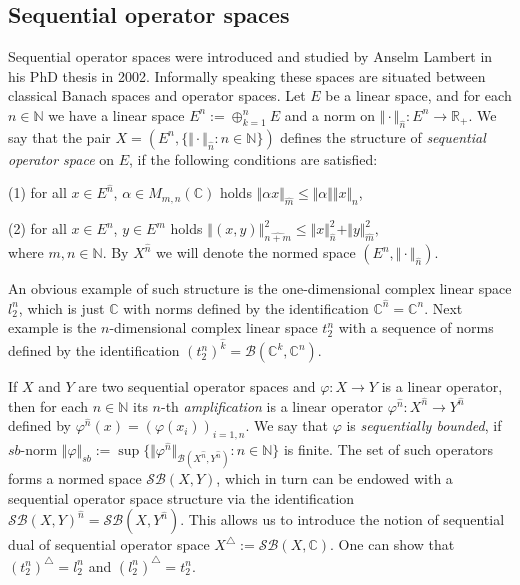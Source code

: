 \documentclass[a0b,landscape]{a0poster}
\begin{document}
\begin{multicols}{4}
\section*{Sequential operator spaces}

Sequential operator spaces were introduced and studied by Anselm Lambert in his
PhD thesis in 2002. Informally speaking these spaces are situated between
classical Banach spaces and operator spaces. Let $E$ be a linear space, and for
each $n\in\mathbb{N}$ we have a linear space $E^n:=\oplus_{k=1}^n E$ and a norm
on $\Vert \cdot \Vert_{\widehat{n}}:E^n\to\mathbb{R}_+$. We say that the pair $X
= (E^n, \{\Vert \cdot \Vert_{\widehat{n}}:n\in\mathbb{N}\})$ defines the
structure of \textit{sequential operator space} on $E$, if the following
conditions are satisfied:

(1) for all $x \in E^{\widehat{n}}$, $\alpha \in M_{m, n}(\mathbb{C})$ holds
$
\Vert \alpha x \Vert_{\widehat{m}}\leq\Vert\alpha\Vert\Vert x\Vert_{\widehat{n}}
$,

(2) for all $x \in E^n$, $y \in E^m$ holds
$
\left\Vert ( x, y ) \right\Vert^2_{\widehat{n + m}} 
\leq \Vert x \Vert_{\widehat{n}}^2 + \Vert y \Vert_{\widehat{m}}^2,
$\\
where $m,n\in\mathbb{N}$. By $X^{\widehat{n}}$ we will denote the normed space
$(E^n,\Vert \cdot \Vert_{\widehat{n}})$.

An obvious example of such structure is the one-dimensional complex linear space
$l_2^n$, which is just $\mathbb{C}$ with norms defined by the identification
$\mathbb{C}^{\widehat{n}}=\mathbb{C}^n$. Next example is the $n$-dimensional
complex linear space $t_2^n$ with a sequence of norms defined by the
identification ${(t_2^n)}^{\widehat{k}}=\mathcal{B}(\mathbb{C}^k,\mathbb{C}^n)$.

If $X$ and $Y$ are two sequential operator spaces and $\varphi : X \rightarrow
Y$ is a linear operator, then for each $n\in\mathbb{N}$ its $n$-th
\textit{amplification} is  
a linear operator $\varphi^{\widehat{n}} : X^{\widehat{n}} \to Y^{\widehat{n}}$
defined by $\varphi^{\widehat{n}}(x)={(\varphi(x_i))}_{i=1,n}$. We say that
$\varphi$ is \textit{sequentially bounded}, if $sb$-norm $\Vert \varphi
\Vert_{sb} := \sup \{\Vert
    \varphi^{\widehat{n}}
\Vert_{\mathcal{B}(X^{\widehat{n}},Y^{\widehat{n}})}:n\in\mathbb{N}\}$
is finite. The set of such operators forms a normed space $\mathcal{SB}(X,Y)$,
which in turn can be endowed with a sequential operator space structure via the
identification
${\mathcal{SB}(X,Y)}^{\widehat{n}}=\mathcal{SB}(X,Y^{\widehat{n}})$. This allows
us to introduce the notion of sequential dual of sequential operator space
$X^\triangle:=\mathcal{SB}(X,\mathbb{C})$. One can show that
${(t_2^n)}^\triangle=l_2^n$ and ${(l_2^n)}^\triangle=t_2^n$.


\end{multicols}
\end{document}
